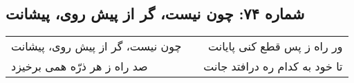 \begin{center}
\section*{شماره ۷۴: چون نیست، گر از پیش روی، پیشانت}
\label{sec:074}
\begin{longtable}{l p{0.5cm} r}
چون نیست، گر از پیش روی، پیشانت
&&
ور راه ز پس قطع کنی پایانت
\\
صد راه ز هر ذرّه همی برخیزد
&&
تا خود به کدام ره درافتد جانت
\\
\end{longtable}
\end{center}
